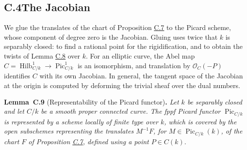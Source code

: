 \documentclass[11pt]{article}
\newenvironment{bpstatement}[2]{\par\addvspace{0.6\baselineskip}\noindent\textbf{#1}#2\textbf{.}\enspace\ignorespaces}
  {\par\addvspace{0.4\baselineskip}}
\newenvironment{bpstatementit}[2]{\begin{bpstatement}{#1}{#2}\itshape\ignorespaces}{\end{bpstatement}}
\begin{document}
\subsection*{\texorpdfstring{C.4\quad The Jacobian}{C.4 The Jacobian}}
\label{bp29}%
\label{bp30}%
We glue the translates of the chart of Proposition \hyperref[bp24]{C.7} to the Picard scheme, whose component of degree zero is the Jacobian. Gluing uses twice that \(k\) is separably closed: to find a rational point for the rigidification, and to obtain the twists of Lemma \hyperref[bp27]{C.8} over \(k\). For an elliptic curve, the Abel map \(C=\operatorname{Hilb}^{1}_{C/k}\to\operatorname{Pic}^1_{C/k}\) is an isomorphism, and translation by \(\mathcal O_C(-P)\) identifies \(C\) with its own Jacobian. In general, the tangent space of the Jacobian at the origin is computed by deforming the trivial sheaf over the dual numbers.

\label{bp31}%
\begin{bpstatementit}{Lemma~C.9}{ (Representability of the Picard functor)}
Let \(k\) be separably closed and let \(C/k\) be a smooth proper connected curve. The fppf Picard functor \(\operatorname{Pic}_{C/k}\) is represented by a scheme locally of finite type over \(k\), which is covered by the open subschemes representing the translates \(M^{-1}F\), for \(M\in\operatorname{Pic}_{C/k}(k)\), of the chart \(F\) of Proposition \hyperref[bp24]{C.7}, defined using a point \(P\in C(k)\).
\end{bpstatementit}
\end{document}
